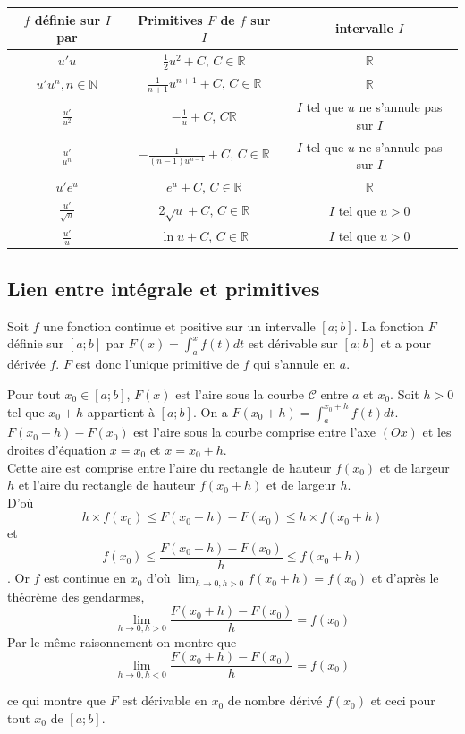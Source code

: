 \documentclass[french]{book}
\begin{document}
\begin{exemple}
\begin{center}
 \begin{tabular}{|c|c|c|}
  \hline
$f$ définie sur $I$ par & Primitives $F$ de $f$ sur $I$ & intervalle $I$ \\
\hline
$u'u$ & $\frac{1}{2}u^2+C,\, C\in\mathbb{R}$ & $\mathbb{R}$ \\
\hline
$u'u^n, n\in\mathbb{N}$ & $\frac{1}{n+1}u^{n+1}+C,\, C\in\mathbb{R}$ & $\mathbb{R}$ \\
\hline
$\frac{u'}{u^2}$ & $-\frac{1}{u}+C,\, C\mathbb{R}$ & $I$ tel que $u$ ne s'annule pas sur $I$ \\
\hline
$\frac{u'}{u^n}$ & $-\frac{1}{(n-1)u^{n-1}}+C,\, C\in\mathbb{R}$ & $I$ tel que $u$ ne s'annule pas sur $I$ \\
\hline
$u'e^u$ & $e^u+C,\,C\in\mathbb{R}$ & $\mathbb{R}$ \\
\hline
$\frac{u'}{\sqrt{u}}$ & 2$\sqrt{u}+C,\, C\in\mathbb{R}$ & $I$ tel que $u>0$ \\
\hline
$\frac{u'}{u}$ & $\ln u+C,\, C\in \mathbb{R}$ & $I$ tel que $u>0$ \\
\hline
\end{tabular}
\end{center}
\end{exemple}
\subsection{Lien entre intégrale et primitives}


\begin{thm}
 Soit $f$ une fonction continue et positive sur un intervalle $[a;b]$. La fonction $F$ définie sur $[a;b]$ par $F(x)=\int_{a}^{x}f(t)dt$ est dérivable sur $[a;b]$ et a pour dérivée $f$. $F$ est donc l'unique primitive de $f$ qui s'annule en $a$.
\end{thm}

\begin{demo}
Pour tout $x_0\in [a;b]$, $F(x)$ est l'aire sous la courbe $\mathcal{C}$ entre $a$ et $x_0$. Soit $h>0$ tel que $x_0+h$ appartient à $[a;b]$. On a $F(x_0+h)=\int_{a}^{x_0+h}f(t)dt$.\\
$F(x_0+h)-F(x_0)$ est l'aire sous la courbe comprise entre l'axe $(Ox)$ et les droites d'équation $x=x_0$ et $x=x_0+h$.\\
Cette aire est comprise entre l'aire du rectangle de hauteur $f(x_0)$ et de largeur $h$ et l'aire du rectangle de hauteur $f(x_0+h)$ et de largeur $h$.\\
D'où $$h\times f(x_0)\leq F(x_0+h)-F(x_0)\leq h\times f(x_0+h)$$
et $$f(x_0)\leq\frac{F(x_0+h)-F(x_0)}{h}\leq f(x_0+h)$$.
Or $f$ est continue en $x_0$ d'où $\lim_{h\rightarrow 0,h>0}f(x_0+h)=f(x_0)$ et d'après le théorème des gendarmes,
$$\lim_{h\rightarrow 0,h>0}\frac{F(x_0+h)-F(x_0)}{h}=f(x_0)$$
Par le même raisonnement on montre que $$\lim_{h\rightarrow 0,h<0}\frac{F(x_0+h)-F(x_0)}{h}=f(x_0)$$

ce qui montre que $F$ est dérivable en $x_0$ de nombre dérivé $f(x_0)$ et ceci pour tout $x_0$ de $[a;b]$.
\end{demo}
\end{document}
